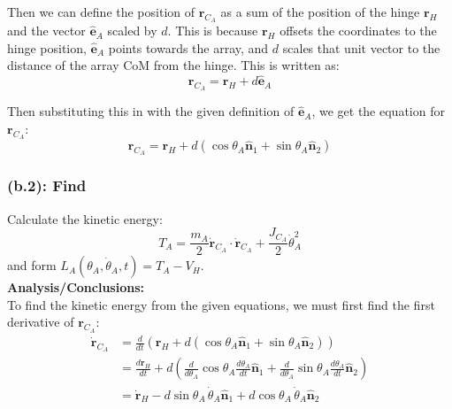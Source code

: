 \documentclass[titlepage]{article}
\begin{document}
Then we can define the position of $\boldsymbol{r}_{C_A}$ as a sum of the position of the hinge $\boldsymbol{r}_H$ and the vector $\hat{\boldsymbol{e}}_A$ scaled by $d$. This is because $\boldsymbol{r}_H$ offsets the coordinates to the hinge position, $\hat{\boldsymbol{e}}_A$ points towards the array, and $d$ scales that unit vector to the distance of the array CoM from the hinge. This is written as:
\begin{equation}
	\boldsymbol{r}_{C_A}=\boldsymbol{r}_H+d\hat{\boldsymbol{e}}_A
\end{equation}
\begin{mdframed}[linewidth=1pt, innertopmargin=10pt, innerbottommargin=10pt]
	Then substituting this in with the given definition of $\hat{\boldsymbol{e}}_A$, we get the equation for $\boldsymbol{r}_{C_A}$:
	\begin{equation}
		\boldsymbol{r}_{C_A}=\boldsymbol{r}_H+d\left(\cos\theta_A\hat{\boldsymbol{n}}_1+\sin\theta_A\hat{\boldsymbol{n}}_2\right)
	\end{equation}
\end{mdframed}

\newpage

\subsubsection*{(b.2): Find}
Calculate the kinetic energy:
\begin{equation}
	T_A=\frac{m_A}{2}\dot{\boldsymbol{r}}_{C_A}\cdot\dot{\boldsymbol{r}}_{C_A}+\frac{J_{C_A}}{2}\dot{\theta}_A^2
	\label{eq:bkinetic}
\end{equation}
and form $L_A(\theta_A,\dot{\theta}_A,t)=T_A-V_H$.\\

\textbf{Analysis/Conclusions:}\\
To find the kinetic energy from the given equations, we must first find the first derivative of $\boldsymbol{r}_{C_A}$:
\begin{equation}
	\begin{split}
		\dot{\boldsymbol{r}}_{C_A}&=\frac{d}{dt}\left(\boldsymbol{r}_H+d\left(\cos\theta_A\hat{\boldsymbol{n}}_1+\sin\theta_A\hat{\boldsymbol{n}}_2\right)\right) \\
		&=\frac{d\boldsymbol{r}_H}{dt}+d\left(\frac{d}{d\theta_A}\cos\theta_A\frac{d\theta_A}{dt}\hat{\boldsymbol{n}}_1+\frac{d}{d\theta_A}\sin\theta_A\frac{d\theta_A}{dt}\hat{\boldsymbol{n}}_2\right) \\
		&=\dot{\boldsymbol{r}}_H-d\sin\theta_A\,\dot{\theta}_A\hat{\boldsymbol{n}}_1+d\cos\theta_A\,\dot{\theta}_A\hat{\boldsymbol{n}}_2 \\
	\end{split}
		\label{eq:rcadot}
\end{equation}
\end{document}
